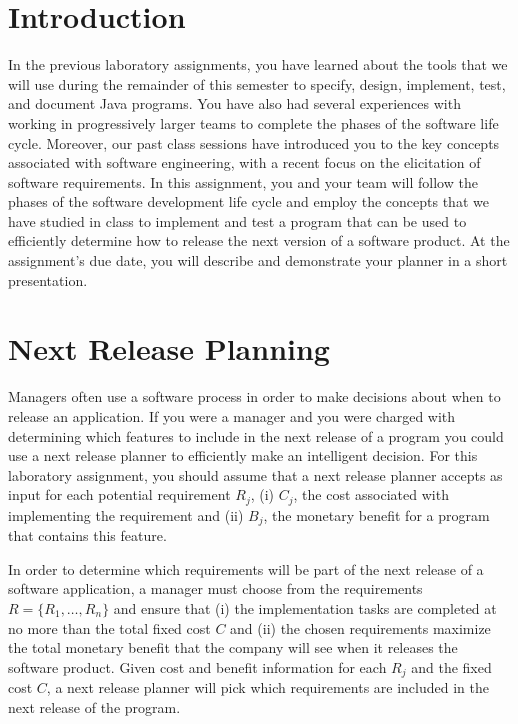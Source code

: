 

\usepackage[compact]{titlesec}



\section*{Introduction}

In the previous laboratory assignments, you have learned about the tools that we will use during the remainder of this
semester to specify, design, implement, test, and document Java programs.  You have also had several experiences with
working in progressively larger teams to complete the phases of the software life cycle.  Moreover, our past class
sessions have introduced you to the key concepts associated with software engineering, with a recent focus on the
elicitation of software requirements.  In this assignment, you and your team will follow the phases of the software
development life cycle and employ the concepts that we have studied in class to implement and test a program that can be
used to efficiently determine how to release the next version of a software product. At the assignment's due date, you
will describe and demonstrate your planner in a short presentation.

\section*{Next Release Planning}

Managers often use a software process in order to make decisions about when to release an application.  If you were a
manager and you were charged with determining which features to include in the next release of a program you could
use a next release planner to efficiently make an intelligent decision.  For this laboratory assignment, you should
assume that a next release planner accepts as input for each potential requirement $R_j$, (i) $C_j$, the cost associated with
implementing the requirement and (ii) $B_j$, the monetary benefit for a program that contains this feature.

In order to determine which requirements will be part of the next release of a software application, a manager must
choose from the requirements $R = \{ R_1, \ldots, R_n \}$ and ensure that (i) the implementation tasks are completed at
no more than the total fixed cost $C$ and (ii) the chosen requirements maximize the total monetary benefit that the
company will see when it releases the software product.  Given cost and benefit information for each $R_j$ and the fixed
cost $C$, a next release planner will pick which requirements are included in the next release of the program.

